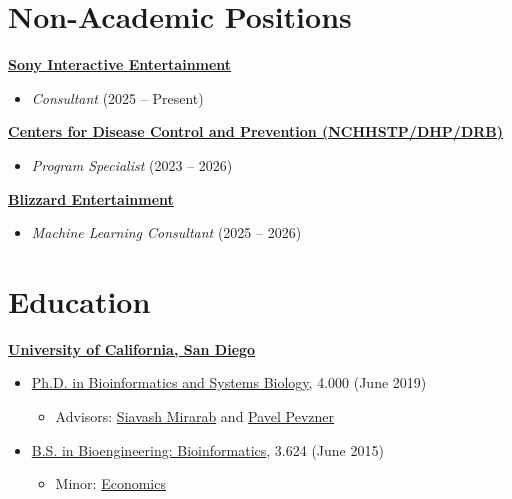 \documentclass[margin,line]{res}
\begin{document}
\begin{resume}
\section{\sc Non-Academic Positions}
{\bf \href{https://sonyinteractive.com/}{Sony Interactive Entertainment}}\\
\vspace*{-.1in}
\begin{itemize}
\item[] \hspace*{-2mm} \textit{Consultant} (2025 -- Present)
\end{itemize}
{\bf \href{https://cdc.gov/}{Centers for Disease Control and Prevention (NCHHSTP/DHP/DRB)}}\\
\vspace*{-.1in}
\begin{itemize}
\item[] \hspace*{-2mm} \textit{Program Specialist} (2023 -- 2026)
\end{itemize}
{\bf \href{https://blizzard.com/}{Blizzard Entertainment}}\\
\vspace*{-.1in}
\begin{itemize}
\item[] \hspace*{-2mm} \textit{Machine Learning Consultant} (2025 -- 2026)
\end{itemize}

\section{\sc Education}
{\bf \href{http://www.ucsd.edu/}{University of California, San Diego}}\\
\vspace*{-.1in}
\begin{itemize}
\item[] \hspace*{-2mm}\href{http://bioinformatics.ucsd.edu/}{Ph.D. in Bioinformatics and Systems Biology}, 4.000 (June 2019)
\begin{itemize}
\item Advisors: \href{http://eceweb.ucsd.edu/~smirarab/}{Siavash Mirarab} and \href{http://cseweb.ucsd.edu/~ppevzner/}{Pavel Pevzner}
\end{itemize}
\vspace*{0in}
\item[] \hspace*{-2mm}\href{http://be.ucsd.edu/bioinformatics}{B.S. in Bioengineering: Bioinformatics}, 3.624 (June 2015)
\begin{itemize}
\item Minor: \href{https://economics.ucsd.edu/undergraduate-program/major-minor-requirements/minors.html}{Economics}
\end{itemize}
\end{itemize}


\end{resume}
\end{document}
